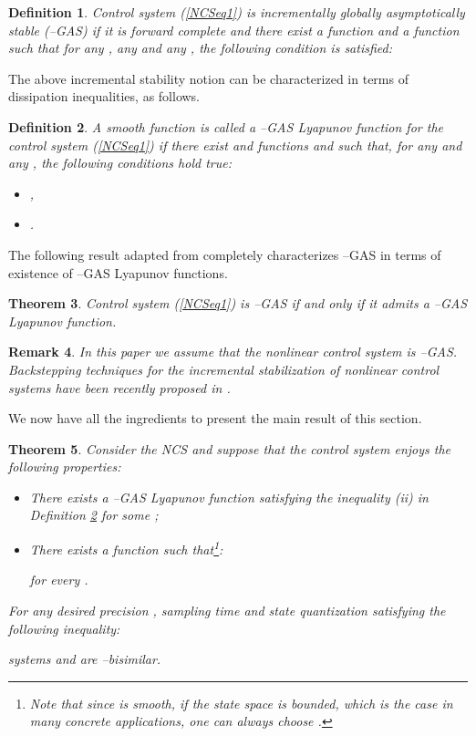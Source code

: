 \documentclass{amsart}
\newtheorem{theorem}{Theorem}[section]
\newtheorem{definition}[theorem]{Definition}
\newtheorem{remark}[theorem]{Remark}
\begin{document}
\begin{definition}
\label{dGAS}
\cite{IncrementalS} 
Control system (\ref{NCSeq1}) is incrementally globally asymptotically stable (--GAS) if it is forward complete and there exist a  function  and a  function  such that for any , any  and any
, the following condition is satisfied:

\end{definition}

The above incremental stability notion can be characterized in terms of dissipation inequalities, as follows.
\begin{definition}
\label{dGAS_Lyapunov}
\cite{IncrementalS} 
A smooth function  is called a --GAS Lyapunov function for the control system (\ref{NCSeq1})  if there exist  and  functions  and  such that, for any  and any , the following conditions hold true:
\begin{itemize}
\item[(i)] ,
\item[(ii)] .
\end{itemize}
\end{definition}

The following result adapted from \cite{IncrementalS} completely characterizes --GAS in terms of existence
of --GAS Lyapunov functions.

\begin{theorem}
\label{TH-IGAS}
Control system (\ref{NCSeq1}) is --GAS if and only if it admits a --GAS Lyapunov function. 
\end{theorem}

\begin{remark}
In this paper we assume that the nonlinear control system  is --GAS. Backstepping techniques for the incremental stabilization of nonlinear control systems have been recently proposed in \cite{MajidBackstepping}.
\end{remark}

We now have all the ingredients to present the main result of this section.

\begin{theorem}
\label{thmain}
Consider the NCS  and suppose that the control system  enjoys the following properties:
\begin{itemize}
\item[(H1)] There exists a --GAS Lyapunov function satisfying the inequality (ii) in Definition \ref{dGAS_Lyapunov} for some ;
\item[(H2)] There exists a  function  such that\footnote{Note that since  is smooth, if the state space  is bounded, which is the case in many concrete applications, one can always choose .}:

for every .
\end{itemize}
For any desired precision , sampling time  and state quantization  satisfying the following inequality:


systems  and  are --bisimilar. 
\label{polaut}
\end{theorem}
\end{document}
